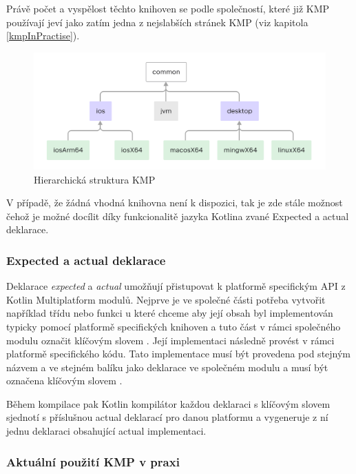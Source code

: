 Právě počet a vyspělost těchto knihoven se podle společností, které již KMP používají jeví jako zatím jedna z nejslabších stránek KMP (viz kapitola \ref{kmpInPractise}).


\begin{figure}[H]
  \centering
  \includegraphics[width=1\textwidth]{kotlin-multiplatform-hierarchical-structure.png}
  \caption{Hierarchická struktura KMP}
  \label{fig:KMP_struktura}
\end{figure}

V případě, že žádná vhodná knihovna není k dispozici, tak je zde stále možnost čehož je možné docílit díky funkcionalitě jazyka Kotlina
zvané Expected a actual deklarace.

\subsubsection*{Expected a actual deklarace}
Deklarace \textit{expected} a \textit{actual} umožňují přistupovat k platformě specifickým API z Kotlin Multiplatform modulů. \cite{KMPExpectActual}
Nejprve je ve společné části potřeba vytvořit například třídu nebo funkci u které chceme aby její obsah byl implementován typicky pomocí
platformě specifických knihoven a tuto část v rámci společného modulu označit klíčovým slovem . \cite{KMPExpectActual} Její implementaci následně provést v rámci
platformě specifického kódu. Tato implementace musí být provedena pod stejným názvem a ve stejném balíku jako deklarace ve společném modulu
a musí být označena klíčovým slovem . \cite{KMPExpectActual}

Během kompilace pak Kotlin kompilátor každou deklaraci s klíčovým slovem  sjednotí s příslušnou actual deklarací pro danou platformu
a vygeneruje z ní jednu deklaraci obsahující actual implementaci. \cite{KMPExpectActual}

\subsubsection*{Aktuální použití KMP v praxi} \label{kmpInPractise}

